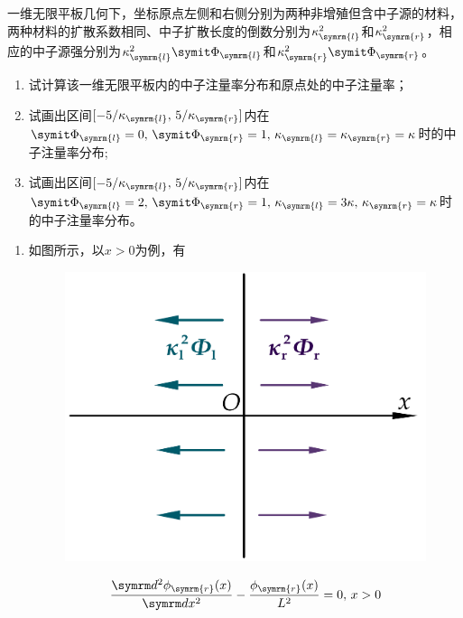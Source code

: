 \begin{exercise}
    一维无限平板几何下，坐标原点左侧和右侧分别为两种非增殖但含中子源的材料，两种材料的扩散系数相同、中子扩散长度的倒数分别为$\kappa_{\symrm{l}}^2$和$\kappa_{\symrm{r}}^2$，相应的中子源强分别为$\kappa_{\symrm{l}}^2 \vPhi_{\symrm{l}}$和$\kappa_{\symrm{r}}^2 \vPhi_{\symrm{r}}$。
    \begin{enumerate}[(1)]
        \item 试计算该一维无限平板内的中子注量率分布和原点处的中子注量率；
        \item 试画出区间$[-5/\kappa_{\symrm{l}},\,5/\kappa_{\symrm{r}}]$内在$\vPhi_{\symrm{l}}=0,\,\vPhi_{\symrm{r}}=1,\,\kappa_{\symrm{l}}=\kappa_{\symrm{r}}=\kappa$时的中子注量率分布;
        \item 试画出区间$[-5/\kappa_{\symrm{l}},\,5/\kappa_{\symrm{r}}]$内在$\vPhi_{\symrm{l}}=2,\,\vPhi_{\symrm{r}}=1,\,\kappa_{\symrm{l}}=3\kappa,\,\kappa_{\symrm{r}}=\kappa$时的中子注量率分布。
    \end{enumerate}
    \begin{solution}
        \begin{enumerate}[(1)]
            \item 如图所示，以$x>0$为例，有
            \begin{figure}[H]
                \centering
                \includegraphics[scale=1]{figures/fig4.9.png}
            \end{figure}
            \begin{equation*}
                \ddv{\phi_{\symrm{r}}(x)}{x} - \frac{\phi_{\symrm{r}}(x)}{L^2} = 0,\,x > 0

\end{equation*}
\end{enumerate}
\end{solution}
\end{exercise}
